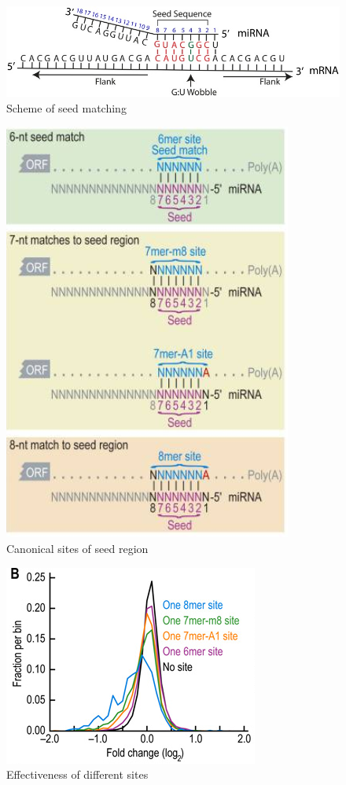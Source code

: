 \documentclass[12pt]{article}
\begin{document}
\begin{figure}
\centering
\includegraphics[scale=3]{results/seedmatching.png} 
\caption{Scheme of seed matching}
\label{seed}
\end{figure}


\begin{figure}
\centering
\includegraphics[scale=0.8]{results/canonical_sites.png}
\caption{Canonical sites of seed region}
\label{Fig:canonical}
\end{figure}


\begin{figure}
\centering
\includegraphics[scale=0.8]{results/site_3addi.png}
\caption{Effectiveness of different sites}
\label{types}
\end{figure}
\end{document}
